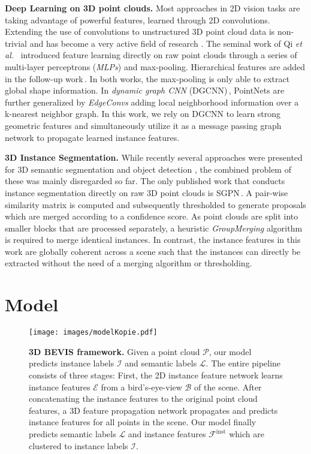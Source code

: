 \documentclass[runningheads]{llncs}
\newcommand{\subsubsubsection}[1]{\vspace{4px} \noindent \textbf{#1}}
\newcommand{\etal}{\textit{et al. }}
\begin{document}
\subsubsubsection{Deep Learning on 3D point clouds.}
Most approaches in 2D vision tasks are taking advantage of powerful features, learned through 2D convolutions.
Extending the use of convolutions to unstructured 3D point cloud data is non-trivial and has become a very active field of research \cite{Qi17CVPR,Qi17NIPS,Tatarchenko18CVPR,Wang18CoRR}.
The seminal work of Qi \etal\,\cite{Qi17CVPR} introduced feature learning directly on raw point clouds through a series of multi-layer perceptrons (\textit{MLPs}) and max-pooling.
Hierarchical features are added in the follow-up work\,\cite{Qi17NIPS}.
In both works, the max-pooling is only able to extract global shape information.
In \emph{dynamic graph CNN} (DGCNN)\,\cite{Wang18CoRR}, PointNets are further generalized by \emph{EdgeConvs} adding local neighborhood information over a k-nearest neighbor graph.
In this work, we rely on DGCNN to learn strong geometric features and simultaneously utilize it as a message passing graph network to propagate learned instance features.

\subsubsubsection{3D Instance Segmentation.}
While recently several approaches were presented for 3D semantic segmentation \cite{Qi17CVPR,Qi17NIPS,Engelmann18ECCVW,Boulch17CG,Wang18CoRR,Engelmann19CoRR,Rethage18ECCV} and object detection \cite{Zhou18CVPR,Qi2017CoRR,Chen17CVPR,Simon18CoRR}, the combined problem of these was mainly disregarded so far.
The only published work that conducts instance segmentation directly on raw 3D point clouds is SGPN\,\cite{Wang18CVPR}.
A pair-wise similarity matrix is computed and subsequently thresholded to generate proposals which are merged according to a confidence score.
As point clouds are split into smaller blocks that are processed separately, a heuristic \emph{GroupMerging} algorithm is required to merge identical instances.
In contrast, the instance features in this work are globally coherent across a scene such that the instances can directly be extracted without the need of a merging algorithm or thresholding.
 


\section{Model}
 \begin{figure}[t]
	\centering
	\texttt{[image: images/modelKopie.pdf]}
	\vspace{-9mm}
	\caption{\textbf{3D BEVIS framework.} Given a point cloud $\mathcal{P}$, our model predicts instance labels $\mathcal{I}$ and semantic labels $\mathcal{L}$. The entire pipeline consists of three stages: First, the 2D instance feature network learns instance features $\mathcal{E}$ from a bird's-eye-view $\mathcal{B}$ of the scene. After concatenating the instance features to the original point cloud features, a 3D feature propagation network propagates and predicts instance features for all points in the scene. Our model finally predicts semantic labels $\mathcal{L}$ and instance features $\mathcal{F}^{\text{inst}}$ which are clustered to instance labels $\mathcal{I}$.}
	\label{fig:model}
\end{figure}
\end{document}
